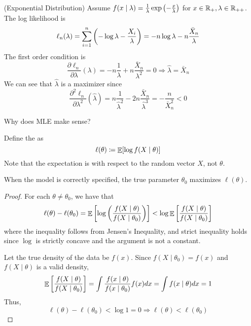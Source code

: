 \documentclass[10pt]{article}
\begin{document}
\begin{example} (Exponential Distribution)
	Assume $f(x \mid \lambda) = \frac{1}{\lambda}\exp\left( -\frac{x}{\lambda}\right)$ for $x \in \mathbb{R}_+,\lambda \in \mathbb{R}_{++}$. The log likelihood is
	\[
	\ell_n(\lambda) = \sum_{i=1}^n \left( - \log \lambda - \frac{X_i}{\lambda}\right) = -n \log \lambda - n \frac{\bar{X}_n}{\lambda}
	\]
	The first order condition is
	\[
	\frac{\partial \ell_n}{\partial \lambda}(\lambda) = -n \frac{1}{\lambda} + n \frac{\bar{X}_n}{\lambda^2} = 0 \Longrightarrow \hat{\lambda} = \bar{X}_n
	\]
	We can see that $\hat{\lambda}$ is a maximizer since
	\[
	\frac{\partial^2 \ell_n}{\partial \lambda^2}(\hat{\lambda}) = n \frac{1}{\hat{\lambda}^2} - 2n \frac{\bar{X}_n}{\hat{\lambda}^3} = -\frac{n}{\bar{X}_n^2} < 0
	\]
\end{example}

\begin{question}
	Why does MLE make sense? 
\end{question}

\begin{definition}
	Define the  as
	\[
	\ell(\theta) \coloneqq \mathop{\mathbb{E}}[\log f(X \mid \theta)]
	\]
	Note that the expectation is with respect to the random vector $X$, not $\theta$.
\end{definition}

\begin{theorem}
	When the model is correctly specified, the true parameter $\theta_0$ maximizes $\ell(\theta)$.
\end{theorem}
\begin{proof}
	For each $\theta \ne \theta_0$, we have that
	\[
	\ell(\theta) - \ell(\theta_0) = \mathop{\mathbb{E}} \left[ \log \left( \frac{f(X \mid \theta)}{f(X \mid \theta_0)}\right) \right] < \log \mathop{\mathbb{E}} \left[ \frac{f(X \mid \theta)}{f(X \mid \theta_0)} \right]
	\]
	where the inequality follows from Jensen's Inequality, and strict inequality holds since $\log$ is strictly concave and the argument is not a constant.
	
	Let the true density of the data be $f(x)$. Since $f(X \mid \theta_0) = f(x)$ and $f(X \mid \theta)$ is a valid density,
	\[
	\mathop{\mathbb{E}} \left[ \frac{f(X \mid \theta)}{f(X \mid \theta_0)} \right] = \int \frac{f(x \mid \theta)}{f(x \mid \theta_0)}f(x) dx = \int f(x \mid \theta) dx = 1
	\]
	Thus, 
	\[
	\ell(\theta) - \ell(\theta_0) < \log 1 = 0 \Longrightarrow \ell(\theta) < \ell(\theta_0)
	\]
\end{proof}
\end{document}
